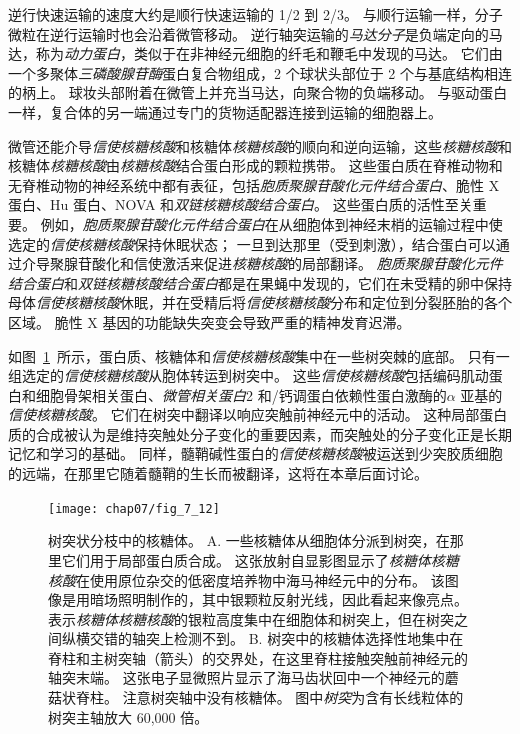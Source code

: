 逆行快速运输的速度大约是顺行快速运输的 1/2 到 2/3。
与顺行运输一样，分子微粒在逆行运输时也会沿着微管移动。
逆行轴突运输的\textit{马达分子}是负端定向的马达，称为\textit{动力蛋白}，类似于在非神经元细胞的纤毛和鞭毛中发现的马达。
它们由一个多聚体\textit{三磷酸腺苷酶}蛋白复合物组成，2 个球状头部位于 2 个与基底结构相连的柄上。
球妆头部附着在微管上并充当马达，向聚合物的负端移动。
与驱动蛋白一样，复合体的另一端通过专门的货物适配器连接到运输的细胞器上。


微管还能介导\textit{信使核糖核酸}和核糖体\textit{核糖核酸}的顺向和逆向运输，这些\textit{核糖核酸}和核糖体\textit{核糖核酸}由\textit{核糖核酸}结合蛋白形成的颗粒携带。
这些蛋白质在脊椎动物和无脊椎动物的神经系统中都有表征，包括\textit{胞质聚腺苷酸化元件结合蛋白}、脆性 X 蛋白、Hu 蛋白、NOVA 和\textit{双链核糖核酸结合蛋白}。
这些蛋白质的活性至关重要。
例如，\textit{胞质聚腺苷酸化元件结合蛋白}在从细胞体到神经末梢的运输过程中使选定的\textit{信使核糖核酸}保持休眠状态；
一旦到达那里（受到刺激），结合蛋白可以通过介导聚腺苷酸化和信使激活来促进\textit{核糖核酸}的局部翻译。
\textit{胞质聚腺苷酸化元件结合蛋白}和\textit{双链核糖核酸结合蛋白}都是在果蝇中发现的，它们在未受精的卵中保持母体\textit{信使核糖核酸}休眠，并在受精后将\textit{信使核糖核酸}分布和定位到分裂胚胎的各个区域。
脆性 X 基因的功能缺失突变会导致严重的精神发育迟滞。


如图~\ref{fig:7_12}~所示，蛋白质、核糖体和\textit{信使核糖核酸}集中在一些树突棘的底部。
只有一组选定的\textit{信使核糖核酸}从胞体转运到树突中。
这些\textit{信使核糖核酸}包括编码肌动蛋白和细胞骨架相关蛋白、\textit{微管相关蛋白}2 和/钙调蛋白依赖性蛋白激酶的$\alpha$ 亚基的\textit{信使核糖核酸}。
它们在树突中翻译以响应突触前神经元中的活动。
这种局部蛋白质的合成被认为是维持突触处分子变化的重要因素，而突触处的分子变化正是长期记忆和学习的基础。
同样，髓鞘碱性蛋白的\textit{信使核糖核酸}被运送到少突胶质细胞的远端，在那里它随着髓鞘的生长而被翻译，这将在本章后面讨论。


\begin{figure}[htbp]
	\centering
	\texttt{[image: chap07/fig\_7\_12]}
	\caption{树突状分枝中的核糖体。
		A. 一些核糖体从细胞体分派到树突，在那里它们用于局部蛋白质合成。
		这张放射自显影图显示了\textit{核糖体核糖核酸}在使用原位杂交的低密度培养物中海马神经元中的分布。
		该图像是用暗场照明制作的，其中银颗粒反射光线，因此看起来像亮点。
		表示\textit{核糖体核糖核酸}的银粒高度集中在细胞体和树突上，但在树突之间纵横交错的轴突上检测不到。
		B. 树突中的核糖体选择性地集中在脊柱和主树突轴（箭头）的交界处，在这里脊柱接触突触前神经元的轴突末端。
		这张电子显微照片显示了海马齿状回中一个神经元的蘑菇状脊柱。
		注意树突轴中没有核糖体。
		图中\textit{树突}为含有长线粒体的树突主轴放大 60,000 倍。}
	\label{fig:7_12}
\end{figure}


